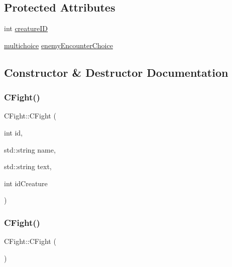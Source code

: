 \subsection*{Protected Attributes}
\begin{DoxyCompactItemize}
\item 
int \mbox{\hyperlink{class_c_fight_a986de57fedf8056ccec818146406efd2}{creature\+ID}}
\item 
\mbox{\hyperlink{_game_menus_8h_acdb545ed67596d0840e35ed209fecbe9}{multichoice}} \mbox{\hyperlink{class_c_fight_ae7e8bdccd47c1064a04668ab1d6af255}{enemy\+Encounter\+Choice}}
\end{DoxyCompactItemize}


\subsection{Constructor \& Destructor Documentation}
\mbox{\label{class_c_fight_ab5f2b154ef7919c84728ffb2a20843d3}} 
\subsubsection{\texorpdfstring{C\+Fight()}{CFight()}\hspace{0.1cm}{\footnotesize\ttfamily [1/2]}}
{\footnotesize\ttfamily C\+Fight\+::\+C\+Fight (\begin{DoxyParamCaption}\item[{int}]{id,  }\item[{std\+::string}]{name,  }\item[{std\+::string}]{text,  }\item[{int}]{id\+Creature }\end{DoxyParamCaption})\hspace{0.3cm}{\ttfamily [inline]}}

\mbox{\label{class_c_fight_a6ab8b9fa1fbc6e2a3fae840f738b9143}} 
\subsubsection{\texorpdfstring{C\+Fight()}{CFight()}\hspace{0.1cm}{\footnotesize\ttfamily [2/2]}}
{\footnotesize\ttfamily C\+Fight\+::\+C\+Fight (\begin{DoxyParamCaption}{ }\end{DoxyParamCaption})\hspace{0.3cm}{\ttfamily [delete]}}



